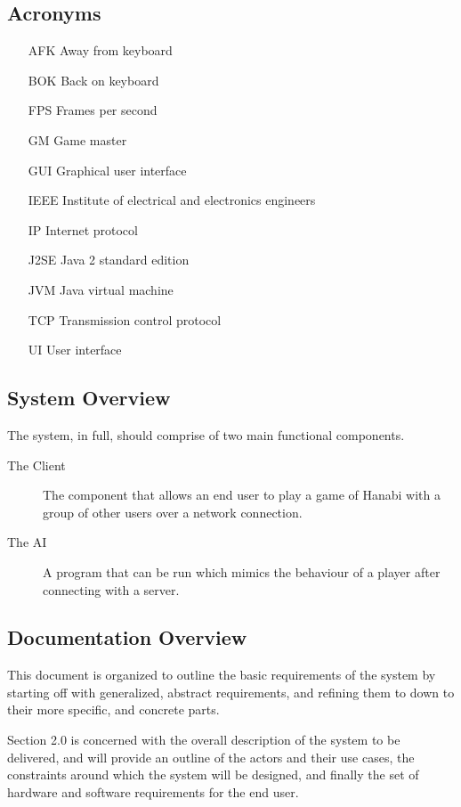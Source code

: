 \documentclass[12pt]{article}
\begin{document}
\subsection{Acronyms}
\begin{itemize}
\item[AFK] Away from keyboard
\item[BOK] Back on keyboard
\item[FPS] Frames per second
\item[GM] Game master
\item[GUI] Graphical user interface
\item[IEEE] Institute of electrical and electronics engineers
\item[IP] Internet protocol
\item[J2SE] Java 2 standard edition
\item[JVM] Java virtual machine
\item[TCP] Transmission control protocol
\item[UI] User interface
\end{itemize}

\subsection{System Overview}
The system, in full, should comprise of two main functional components.
\begin{description}
\item[The Client]
The component that allows an end user to play a game of Hanabi with
a group of other users over a network connection.
\item[The AI]
A program that can be run which mimics the behaviour of a player
after connecting with a server.
\end{description}

\subsection{Documentation Overview}
This document is organized to outline the basic requirements of the system by
starting off with generalized, abstract requirements, and refining them to
down to their more specific, and concrete parts.

Section 2.0 is concerned with the overall description of the system to be 
delivered, and will provide an outline of the actors and their use cases, the constraints
around which the system will be designed, and finally the set of hardware and 
software requirements for the end user.
\end{document}
